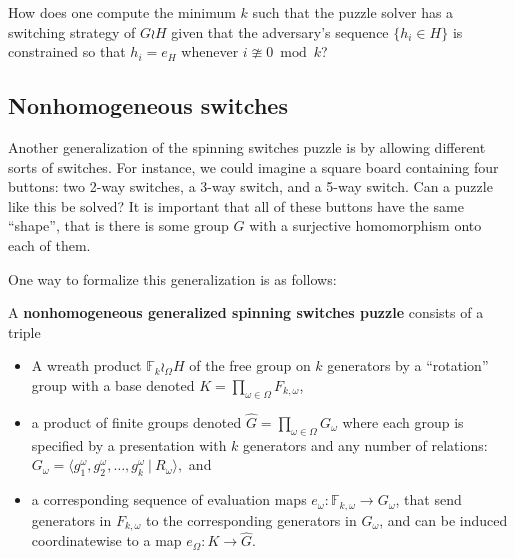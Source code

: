 \begin{openquestion}
  How does one compute the minimum $k$ such that the puzzle solver has a
  switching strategy of $G \wr H$ given that the adversary's sequence
  $\{h_i \in H\}$ is constrained so that $h_i = e_H$ whenever ${i \ncong 0 \bmod k}$?
\end{openquestion}

\subsection{Nonhomogeneous switches}

Another generalization of the spinning switches puzzle is by allowing different
sorts of switches. For instance, we could imagine a square board
containing four buttons: two 2-way switches, a 3-way switch, and a 5-way switch.
Can a puzzle like this be solved?
It is important that all of these buttons have the same ``shape'', that is
there is some group $G$ with a surjective homomorphism onto each of them.



One way to formalize this generalization is as follows:
\begin{definition}
  A \textbf{nonhomogeneous generalized spinning switches puzzle}
  consists of a triple \begin{itemize}
    \item A wreath product \(
      \mathbb F_k \wr_\Omega H
    \) of the free group on $k$ generators by a ``rotation'' group
    with a base denoted \(K = \prod_{\omega \in \Omega} F_{k, \omega}\),
    \item a product of finite groups denoted
    $\hat G = \prod_{\omega \in \Omega} G_\omega$ where each group is specified
    by a presentation with $k$ generators and any number of relations:
    \({
      G_\omega = \langle g^\omega_1, g^\omega_2, \dots, g^\omega_k\ |\ R_\omega\rangle,
    }\) and
    \item a corresponding sequence of evaluation maps
    $e_\omega \colon \mathbb F_{k,\omega} \rightarrow G_\omega$,
    that send generators in $F_{k,\omega}$ to the corresponding generators in
    $G_\omega$, and
    can be induced coordinatewise to a map $e_\Omega \colon K \rightarrow \hat{G}$.
  \end{itemize}
\end{definition}

